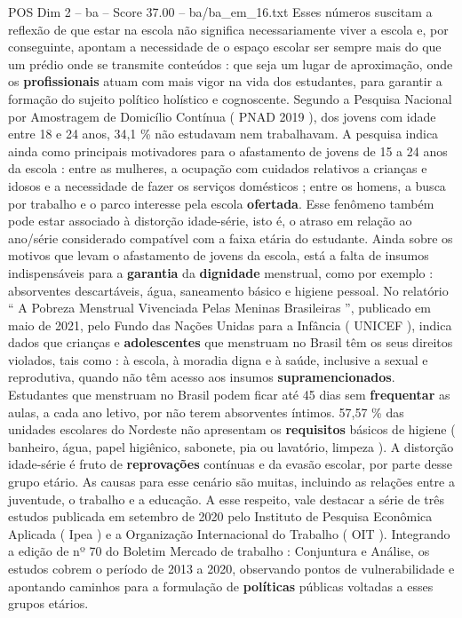 \begin{textsample}{POS Dim 2 – ba – Score 37.00 – ba/ba\_em\_16.txt}
Esses números suscitam a reflexão de que estar na escola não significa necessariamente viver a escola e, por conseguinte, apontam a necessidade de o espaço escolar ser sempre mais do que um prédio onde se transmite conteúdos : que seja um lugar de aproximação, onde os \textbf{profissionais} atuam com mais vigor na vida dos estudantes, para garantir a formação do sujeito político holístico e cognoscente.
Segundo a Pesquisa Nacional por Amostragem de Domicílio Contínua ( PNAD 2019 ), dos jovens com idade entre 18 e 24 anos, 34,1 \% não estudavam nem trabalhavam.
A pesquisa indica ainda como principais motivadores para o afastamento de jovens de 15 a 24 anos da escola : entre as mulheres, a ocupação com cuidados relativos a crianças e idosos e a necessidade de fazer os serviços domésticos ; entre os homens, a busca por trabalho e o parco interesse pela escola \textbf{ofertada}.
Esse fenômeno também pode estar associado à distorção idade-série, isto é, o atraso em relação ao ano/série considerado compatível com a faixa etária do estudante.
Ainda sobre os motivos que levam o afastamento de jovens da escola, está a falta de insumos indispensáveis para a \textbf{garantia} da \textbf{dignidade} menstrual, como por exemplo : absorventes descartáveis, água, saneamento básico e higiene pessoal.
No relatório “ A Pobreza Menstrual Vivenciada Pelas Meninas Brasileiras ”, publicado em maio de 2021, pelo Fundo das Nações Unidas para a Infância ( UNICEF ), indica dados que crianças e \textbf{adolescentes} que menstruam no Brasil têm os seus direitos violados, tais como : à escola, à moradia digna e à saúde, inclusive a sexual e reprodutiva, quando não têm acesso aos insumos \textbf{supramencionados}.
Estudantes que menstruam no Brasil podem ficar até 45 dias sem \textbf{frequentar} as aulas, a cada ano letivo, por não terem absorventes íntimos. 57,57 \% das unidades escolares do Nordeste não apresentam os \textbf{requisitos} básicos de higiene ( banheiro, água, papel higiênico, sabonete, pia ou lavatório, limpeza ).
A distorção idade-série é fruto de \textbf{reprovações} contínuas e da evasão escolar, por parte desse grupo etário.
As causas para esse cenário são muitas, incluindo as relações entre a juventude, o trabalho e a educação.
A esse respeito, vale destacar a série de três estudos publicada em setembro de 2020 pelo Instituto de Pesquisa Econômica Aplicada ( Ipea ) e a Organização Internacional do Trabalho ( OIT ).
Integrando a edição de nº 70 do Boletim Mercado de trabalho : Conjuntura e Análise, os estudos cobrem o período de 2013 a 2020, observando pontos de vulnerabilidade e apontando caminhos para a formulação de \textbf{políticas} públicas voltadas a esses grupos etários.

\end{textsample}
